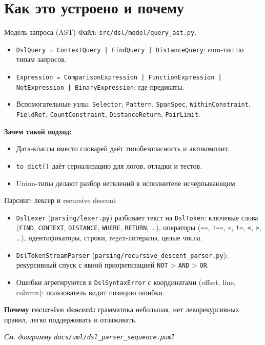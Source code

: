 \documentclass[aspectratio=169,11pt]{beamer}
\newcommand{\uml}[1]{\textit{См. диаграмму \texttt{docs/uml/#1}}}
\begin{document}
\section{Как это устроено и почему}

\begin{frame}{Модель запроса (AST)}
  Файл: \texttt{src/dsl/model/query\_ast.py}.
  \begin{itemize}
    \item \texttt{DslQuery = ContextQuery | FindQuery | DistanceQuery}: sum-тип
          по типам запросов.
    \item \texttt{Expression = ComparisonExpression | FunctionExpression
          | NotExpression | BinaryExpression}: где-предикаты.
    \item Вспомогательные узлы: \texttt{Selector}, \texttt{Pattern},
          \texttt{SpanSpec}, \texttt{WithinConstraint}, \texttt{FieldRef},
          \texttt{CountConstraint}, \texttt{DistanceReturn}, \texttt{PairLimit}.
  \end{itemize}
  \vspace{0.4em}
  \textbf{Зачем такой подход:}
  \begin{itemize}
    \item Дата-классы вместо словарей даёт типобезопасность и
          автокомплит.
    \item \texttt{to\_dict()} даёт сериализацию для логов, отладки и тестов.
    \item Union-типы делают разбор ветвлений в исполнителе исчерпывающим.
  \end{itemize}
\end{frame}

\begin{frame}{Парсинг: лексер и recursive descent}
  \begin{itemize}
    \item \texttt{DslLexer} (\texttt{parsing/lexer.py}) разбивает текст на
          \texttt{DslToken}: ключевые слова (\texttt{FIND}, \texttt{CONTEXT},
          \texttt{DISTANCE}, \texttt{WHERE}, \texttt{RETURN}, \dots), операторы
          (\texttt{\textasciitilde =}, \texttt{!\textasciitilde =}, \texttt{=},
          \texttt{!=}, \texttt{<}, \texttt{>}, \dots), идентификаторы, строки,
          regex-литералы, целые числа.
    \item \texttt{DslTokenStreamParser}
          (\texttt{parsing/recursive\_descent\_parser.py}): рекурсивный спуск
          с явной приоритизацией \texttt{NOT} > \texttt{AND} > \texttt{OR}.
    \item Ошибки агрегируются в \texttt{DslSyntaxError} с координатами
          (offset, line, column): пользователь видит позицию ошибки.
  \end{itemize}
  \vspace{0.3em}
  \textbf{Почему recursive descent:} грамматика небольшая, нет леворекурсивных
  правил, легко поддерживать и отлаживать.
  \par\vspace{0.3em}
  \uml{dsl\_parser\_sequence.puml}
\end{frame}
\end{document}
